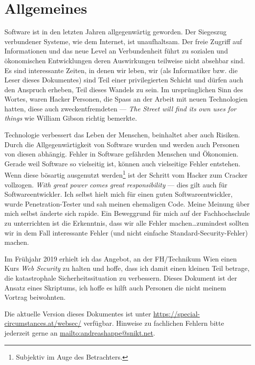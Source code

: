 \chapter{Allgemeines}

Software ist in den letzten Jahren allgegenwärtig geworden. Der Siegeszug verbundener Systeme, wie dem Internet,  ist unaufhaltsam. Der freie Zugriff auf Informationen und das neue Level an Verbundenheit führt zu sozialen und ökonomischen Entwicklungen deren Auswirkungen teilweise nicht absehbar sind. Es sind interessante Zeiten, in denen wir leben, wir (als Informatiker bzw. die Leser dieses Dokumentes) sind Teil einer privilegierten Schicht und dürfen auch den Anspruch erheben, Teil dieses Wandels zu sein. Im ursprünglichen Sinn des Wortes, waren Hacker Personen, die Spass an der Arbeit mit neuen Technologien hatten, diese auch zweckentfremdeten --- \textit{The Street will find its own uses for things} wie William Gibson richtig bemerkte.

Technologie verbessert das Leben der Menschen, beinhaltet aber auch Risiken. Durch die Allgegenwärtigkeit von Software wurden und werden auch Personen von diesen abhängig. Fehler in Software gefährden Menschen und Ökonomien. Gerade weil Software so vielseitig ist, können auch vielseitige Fehler entstehen. Wenn diese bösartig ausgenutzt werden\footnote{Subjektiv im Auge des Betrachters.} ist der Schritt vom Hacker zum Cracker vollzogen. \textit{With great power comes great responsibility} --- dies gilt auch für Softwareentwickler. Ich selbst hielt mich für einen guten Softwareentwickler, wurde Penetration-Tester und sah meinen ehemaligen Code. Meine Meinung über mich selbst änderte sich rapide. Ein Beweggrund für mich auf der Fachhochschule zu unterrichten ist die Erkenntnis, dass wir alle Fehler machen\ldots zumindest sollten wir in dem Fall interessante Fehler (und nicht einfache Standard-Security-Fehler) machen.

Im Frühjahr 2019 erhielt ich das Angebot, an der FH/Technikum Wien einen Kurs \textit{Web Security} zu halten und hoffe, dass ich damit einen kleinen Teil betrage, die katastrophale Sicherheitssituation zu verbessern. Dieses Dokument ist der Ansatz eines Skriptums, ich hoffe es hilft auch Personen die nicht meinem Vortrag beiwohnten.

Die aktuelle Version dieses Dokumentes ist unter \url{https://special-circumstances.at/websec/} verfügbar. Hinweise zu fachlichen Fehlern bitte jederzeit gerne an \url{mailto:andreashappe@snikt.net}.


